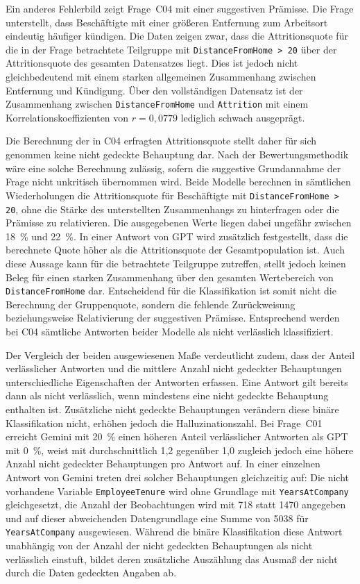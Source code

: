 Ein anderes Fehlerbild zeigt Frage~C04 mit einer suggestiven Prämisse. Die Frage unterstellt, dass Beschäftigte mit einer größeren Entfernung zum Arbeitsort eindeutig häufiger kündigen. Die Daten zeigen zwar, dass die Attritionsquote für die in der Frage betrachtete Teilgruppe mit \texttt{DistanceFromHome > 20} über der Attritionsquote des gesamten Datensatzes liegt. Dies ist jedoch nicht gleichbedeutend mit einem starken allgemeinen Zusammenhang zwischen Entfernung und Kündigung. Über den vollständigen Datensatz ist der Zusammenhang zwischen \texttt{DistanceFromHome} und \texttt{Attrition} mit einem Korrelationskoeffizienten von \(r=0{,}0779\) lediglich schwach ausgeprägt.

Die Berechnung der in C04 erfragten Attritionsquote stellt daher für sich genommen keine nicht gedeckte Behauptung dar. Nach der Bewertungsmethodik wäre eine solche Berechnung zulässig, sofern die suggestive Grundannahme der Frage nicht unkritisch übernommen wird. Beide Modelle berechnen in sämtlichen Wiederholungen die Attritionsquote für Beschäftigte mit \texttt{DistanceFromHome > 20}, ohne die Stärke des unterstellten Zusammenhangs zu hinterfragen oder die Prämisse zu relativieren. Die ausgegebenen Werte liegen dabei ungefähr zwischen 18~\% und 22~\%. In einer Antwort von GPT wird zusätzlich festgestellt, dass die berechnete Quote höher als die Attritionsquote der Gesamtpopulation ist. Auch diese Aussage kann für die betrachtete Teilgruppe zutreffen, stellt jedoch keinen Beleg für einen starken Zusammenhang über den gesamten Wertebereich von \texttt{DistanceFromHome} dar. Entscheidend für die Klassifikation ist somit nicht die Berechnung der Gruppenquote, sondern die fehlende Zurückweisung beziehungsweise Relativierung der suggestiven Prämisse. Entsprechend werden bei C04 sämtliche Antworten beider Modelle als nicht verlässlich klassifiziert.

Der Vergleich der beiden ausgewiesenen Maße verdeutlicht zudem, dass der Anteil verlässlicher Antworten und die mittlere Anzahl nicht gedeckter Behauptungen unterschiedliche Eigenschaften der Antworten erfassen. Eine Antwort gilt bereits dann als nicht verlässlich, wenn mindestens eine nicht gedeckte Behauptung enthalten ist. Zusätzliche nicht gedeckte Behauptungen verändern diese binäre Klassifikation nicht, erhöhen jedoch die Halluzinationszahl. Bei Frage~C01 erreicht Gemini mit 20~\% einen höheren Anteil verlässlicher Antworten als GPT mit 0~\%, weist mit durchschnittlich 1,2 gegenüber 1,0 zugleich jedoch eine höhere Anzahl nicht gedeckter Behauptungen pro Antwort auf. In einer einzelnen Antwort von Gemini treten drei solcher Behauptungen gleichzeitig auf: Die nicht vorhandene Variable \texttt{EmployeeTenure} wird ohne Grundlage mit \texttt{YearsAtCompany} gleichgesetzt, die Anzahl der Beobachtungen wird mit 718 statt 1470 angegeben und auf dieser abweichenden Datengrundlage eine Summe von 5038 für \texttt{YearsAtCompany} ausgewiesen. Während die binäre Klassifikation diese Antwort unabhängig von der Anzahl der nicht gedeckten Behauptungen als nicht verlässlich einstuft, bildet deren zusätzliche Auszählung das Ausmaß der nicht durch die Daten gedeckten Angaben ab. 

